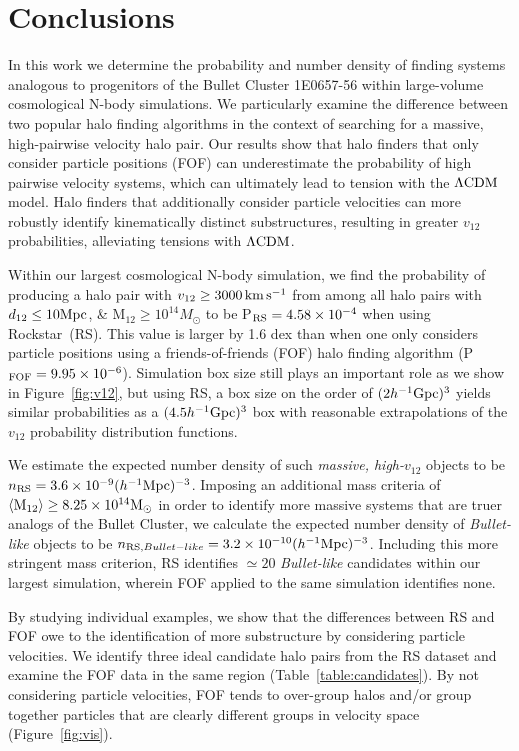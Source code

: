 \documentclass[useAMS, usenatbib]{mn2e}
\newcommand{\Msun}{M_{\odot}}
\newcommand{\hinv}{h^{-1}}
\newcommand{\vonetwo}{v_{12}}
\newcommand{\lcdm}{\Lambda\rm{CDM}}
\newcommand{\kms}{\,\rm{km}\,\rm{s}^{-1}}
\newcommand{\RS}{{\sc Rockstar}}
\begin{document}
\section{Conclusions}
\label{sec:conclusions}

In this work we determine the probability and number density of
finding systems analogous to progenitors of the Bullet Cluster
1E0657-56 within large-volume cosmological N-body simulations.  We
particularly examine the difference between two popular halo finding
algorithms in the context of searching for a massive, high-pairwise
velocity halo pair.  Our results show that halo finders that only
consider particle positions (FOF) can underestimate the probability
of high pairwise velocity systems, which can ultimately lead to
tension with the $\lcdm$ model.  Halo finders that additionally
consider particle velocities can more robustly
identify kinematically distinct substructures, resulting in greater
$\vonetwo$ probabilities, alleviating tensions with $\lcdm$.

Within our largest cosmological N-body simulation, we find the
probability of producing a halo pair with $\vonetwo\geq3000\kms$
from among all halo pairs with $d_{12}\leq10\rm{Mpc}$, \& M$_{12}\geq10^{14}\Msun$ to be
P$_{\rm{RS}}=4.58\times10^{-4}$ when using \RS\ (RS).
This value is larger by 1.6 dex than when one only considers particle
positions using a friends-of-friends (FOF) halo finding algorithm 
(P$_{\rm{FOF}}=9.95\times10^{-6}$).  Simulation box size
still plays an important role as we show in Figure~\ref{fig:v12},
but using RS, a box size on the order of $(2\hinv\rm{Gpc})^3$ yields
similar probabilities as a $(4.5\hinv\rm{Gpc})^3$ box with reasonable
extrapolations of the $\vonetwo$ probability distribution functions.

We estimate the expected number density of such {\it massive, high-$\vonetwo$}
objects to be $n_{\rm{RS}}=3.6\times10^{-9}(\hinv\rm{Mpc})^{-3}$.
Imposing an additional mass criteria of $\langle \rm{M}_{12} \rangle
\geq 8.25\times10^{14}\Msun$ in order to identify more massive systems
that are truer analogs of the Bullet Cluster, we calculate the
expected number density of {\it Bullet-like} objects to be
$n_{{\rm RS},Bullet-like}=3.2\times10^{-10}(\hinv\rm{Mpc})^{-3}$.
Including this more stringent mass criterion, RS identifies $\simeq20$
{\it Bullet-like} candidates within our largest simulation, wherein
FOF applied to the same simulation identifies none.

By studying individual examples, we show that the differences between
RS and FOF owe to the identification of more substructure by
considering particle velocities.  We identify three ideal candidate
halo pairs from the RS dataset and examine the FOF data in the same
region (Table~\ref{table:candidates}).  By not considering particle
velocities, FOF tends to over-group halos and/or group together
particles that are clearly different groups in velocity space
(Figure~\ref{fig:vis}).
\end{document}
